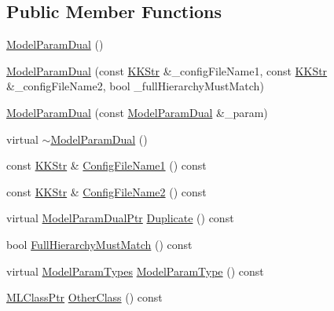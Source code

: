 \subsection*{Public Member Functions}
\begin{DoxyCompactItemize}
\item 
\hyperlink{class_k_k_m_l_l_1_1_model_param_dual_af5d858c18bbbeab7abd6cefc5beafdb9}{Model\+Param\+Dual} ()
\item 
\hyperlink{class_k_k_m_l_l_1_1_model_param_dual_a034509b44dc95c52a4e374cc9f8eadc6}{Model\+Param\+Dual} (const \hyperlink{class_k_k_b_1_1_k_k_str}{K\+K\+Str} \&\+\_\+config\+File\+Name1, const \hyperlink{class_k_k_b_1_1_k_k_str}{K\+K\+Str} \&\+\_\+config\+File\+Name2, bool \+\_\+full\+Hierarchy\+Must\+Match)
\item 
\hyperlink{class_k_k_m_l_l_1_1_model_param_dual_a6689047fe5fea427af77f30518d49019}{Model\+Param\+Dual} (const \hyperlink{class_k_k_m_l_l_1_1_model_param_dual}{Model\+Param\+Dual} \&\+\_\+param)
\item 
virtual \hyperlink{class_k_k_m_l_l_1_1_model_param_dual_a2baec1df536a27807b70b87daf54fded}{$\sim$\+Model\+Param\+Dual} ()
\item 
const \hyperlink{class_k_k_b_1_1_k_k_str}{K\+K\+Str} \& \hyperlink{class_k_k_m_l_l_1_1_model_param_dual_af2900e50f7a1ea37e236b50f8f005837}{Config\+File\+Name1} () const 
\item 
const \hyperlink{class_k_k_b_1_1_k_k_str}{K\+K\+Str} \& \hyperlink{class_k_k_m_l_l_1_1_model_param_dual_ab8f04150ca014f0d8244b0f01a10503a}{Config\+File\+Name2} () const 
\item 
virtual \hyperlink{class_k_k_m_l_l_1_1_model_param_dual_a83c76ba9be647e769ae21200719f9a23}{Model\+Param\+Dual\+Ptr} \hyperlink{class_k_k_m_l_l_1_1_model_param_dual_ab11ce0c651445d53bd58f458f9ad42f5}{Duplicate} () const 
\item 
bool \hyperlink{class_k_k_m_l_l_1_1_model_param_dual_ab358ce3c1c30ecb0ec22dd269d0d8098}{Full\+Hierarchy\+Must\+Match} () const 
\item 
virtual \hyperlink{class_k_k_m_l_l_1_1_model_param_a5984a5fe225fdbe8e40fb5ec746a42d0}{Model\+Param\+Types} \hyperlink{class_k_k_m_l_l_1_1_model_param_dual_adebfade6e2e2d0423397dd9a0e5aba08}{Model\+Param\+Type} () const 
\item 
\hyperlink{namespace_k_k_m_l_l_ac272393853d59e72e8456f14cd6d8c23}{M\+L\+Class\+Ptr} \hyperlink{class_k_k_m_l_l_1_1_model_param_dual_a5069c91281030811fb8563009ed0c488}{Other\+Class} () const 
\item 

\end{DoxyCompactItemize}
